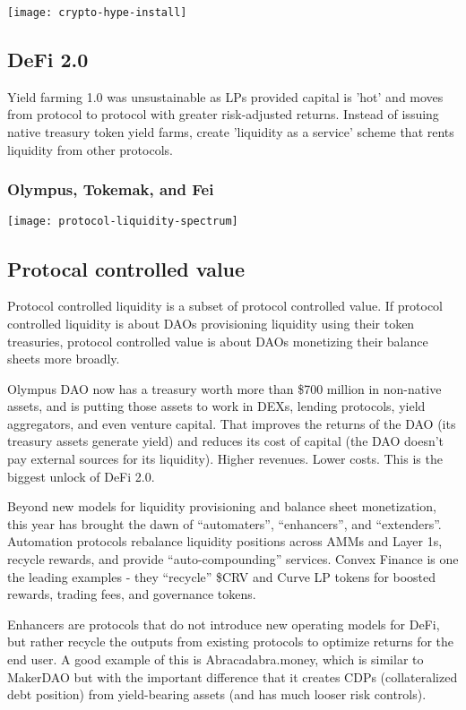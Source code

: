 \documentclass{../notes}
\begin{document}
\texttt{[image: crypto-hype-install]}

\subsection{DeFi 2.0}
Yield farming 1.0 was unsustainable as LPs provided capital is 'hot' and moves from protocol to protocol with greater risk-adjusted returns. Instead of issuing native treasury token yield farms, create 'liquidity as a service' scheme that rents liquidity from other protocols. 

\subsubsection{Olympus, Tokemak, and Fei}

\texttt{[image: protocol-liquidity-spectrum]}

\subsection{Protocal controlled value}
Protocol controlled liquidity is a subset of protocol controlled value. If protocol controlled liquidity is about DAOs provisioning liquidity using their token treasuries, protocol controlled value is about DAOs monetizing their balance sheets more broadly.

Olympus DAO now has a treasury worth more than \$700 million in non-native assets, and is putting those assets to work in DEXs, lending protocols, yield aggregators, and even venture capital. That improves the returns of the DAO (its treasury assets generate yield) and reduces its cost of capital (the DAO doesn’t pay external sources for its liquidity). Higher revenues. Lower costs. This is the biggest unlock of DeFi 2.0.

Beyond new models for liquidity provisioning and balance sheet monetization, this year has brought the dawn of “automaters”, “enhancers”, and “extenders”. Automation protocols rebalance liquidity positions across AMMs and Layer 1s, recycle rewards, and provide “auto-compounding” services. Convex Finance is one the leading examples - they “recycle” \$CRV and Curve LP tokens for boosted rewards, trading fees, and governance tokens.

Enhancers are protocols that do not introduce new operating models for DeFi, but rather recycle the outputs from existing protocols to optimize returns for the end user. A good example of this is Abracadabra.money, which is similar to MakerDAO but with the important difference that it creates CDPs (collateralized debt position) from yield-bearing assets (and has much looser risk controls).
\end{document}
